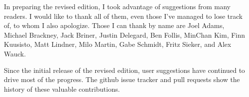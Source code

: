 In preparing the revised edition, I took advantage of suggestions from many readers.  I would like to thank all of them, even those I've managed to lose track of, to whom I also apologize.  Those I can thank by name are Joel Adams, Michael Brackney, Jack Briner, Justin Delegard, Ben Follis, MinChan Kim, Finn Kuusisto, Matt Lindner, Milo Martin, Gabe Schmidt, Fritz Sieker, and Alex Wauck.

Since the initial release of the revised edition, user suggestions have continued to drive most of the progress. The github issue tracker and pull requests show the history of these valuable contributions.
